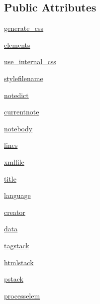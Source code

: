 \subsection*{Public Attributes}
\begin{DoxyCompactItemize}
\item 
\hyperlink{classodf_1_1odf2xhtml_1_1ODF2XHTML_aa6e54ac722aed4b5fea0645fdd7e80c0}{generate\+\_\+css}
\item 
\hyperlink{classodf_1_1odf2xhtml_1_1ODF2XHTML_ab06ecdbc49f7f31d3c5274cb612af4e6}{elements}
\item 
\hyperlink{classodf_1_1odf2xhtml_1_1ODF2XHTML_a3cffe38f14e08fd6dd0605caee6b20a2}{use\+\_\+internal\+\_\+css}
\item 
\hyperlink{classodf_1_1odf2xhtml_1_1ODF2XHTML_acf4575c8d15a8191a0f208af3edae66d}{stylefilename}
\item 
\hyperlink{classodf_1_1odf2xhtml_1_1ODF2XHTML_a2c69d8e25a9d351f604594713fd89bd5}{notedict}
\item 
\hyperlink{classodf_1_1odf2xhtml_1_1ODF2XHTML_ab4e4c31b772b8e9d99e1a3119aaa3156}{currentnote}
\item 
\hyperlink{classodf_1_1odf2xhtml_1_1ODF2XHTML_a4107eb14ee53672b15f8cc11e9ac0276}{notebody}
\item 
\hyperlink{classodf_1_1odf2xhtml_1_1ODF2XHTML_ae647cf840776cd0919a89c8b0b978ade}{lines}
\item 
\hyperlink{classodf_1_1odf2xhtml_1_1ODF2XHTML_a7f4bf0df56081f422b31f78f6490d5af}{xmlfile}
\item 
\hyperlink{classodf_1_1odf2xhtml_1_1ODF2XHTML_ac02b24b23d0701d3ee157c15bdabd93d}{title}
\item 
\hyperlink{classodf_1_1odf2xhtml_1_1ODF2XHTML_ad1013cafb423e05c7bc67cb23bb152de}{language}
\item 
\hyperlink{classodf_1_1odf2xhtml_1_1ODF2XHTML_a6956690a2be9d98b0b46e7300a41a001}{creator}
\item 
\hyperlink{classodf_1_1odf2xhtml_1_1ODF2XHTML_ab9f15ff72cc5a06c605b554ea208cde0}{data}
\item 
\hyperlink{classodf_1_1odf2xhtml_1_1ODF2XHTML_a982a04827cdc62e08e0eef40b5436cc9}{tagstack}
\item 
\hyperlink{classodf_1_1odf2xhtml_1_1ODF2XHTML_aaacf1ec312513c60f704e9f9d774915c}{htmlstack}
\item 
\hyperlink{classodf_1_1odf2xhtml_1_1ODF2XHTML_ae0d89428e18dc8851d750d041829b200}{pstack}
\item 
\hyperlink{classodf_1_1odf2xhtml_1_1ODF2XHTML_a2c49e30dd5748171bcb695393989191f}{processelem}

\end{DoxyCompactItemize}
